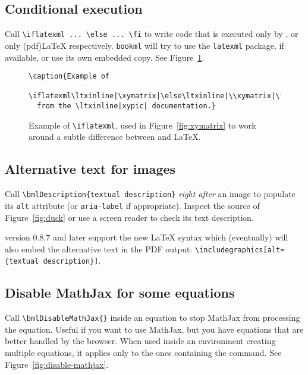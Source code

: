 \documentclass[a4paper,british]{article}
\def\ltxinline{\lstinline[style=bookml]}
\def\htmlinline{\lstinline[language=html]}
\begin{document}
\subsection{Conditional execution}
Call \ltxinline|\iflatexml ... \else ... \fi| to write code that is executed only by \LaTeXML{}, or only (pdf)\LaTeX{} respectively. \lstinline|bookml| will try to use the \lstinline|latexml| package, if available, or use its own embedded copy. See Figure~\ref{fig:iflatexml}.

\begin{figure}[hb]
  \begin{lstlisting}[style=bookml]
\caption{Example of
  \iflatexml\ltxinline|\xymatrix|\else\ltxinline|\\xymatrix|\fi{}
  from the \ltxinline|xypic| documentation.}
  \end{lstlisting}
  \caption{Example of \texttt{\textbackslash{}iflatexml}, used in Figure~\ref{fig:xymatrix} to work around a subtle difference between \LaTeXML{} and \LaTeX{}.}
  \label{fig:iflatexml}
\end{figure}

\subsection{Alternative text for images}
Call \ltxinline|\bmlDescription{textual description}| \emph{right after} an image to populate its \htmlinline|alt| attribute (or \ltxinline|aria-label| if appropriate). Inspect the \HTML{} source of Figure~\ref{fig:duck} or use a screen reader to check its text description.

\LaTeXML{} version 0.8.7 and later support the new \LaTeX{} syntax which (eventually) will also embed the alternative text in the PDF output: \ltxinline|\includegraphics[alt={textual description}]|.

\subsection{Disable MathJax for some equations}
Call \ltxinline|\bmlDisableMathJax{}| inside an equation to stop MathJax from processing the equation. Useful if you want to use MathJax, but you have equations that are better handled by the browser. When used inside an environment creating multiple equations, it applies only to the ones containing the command. See Figure~\ref{fig:disable-mathjax}.
\end{document}
